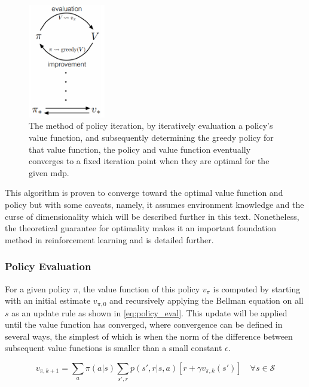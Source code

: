 \documentclass[../report.tex]{subfiles}
\begin{document}
\begin{figure}[H]
    \centering
    \includegraphics[width=0.3\textwidth]{figures/01/gpi.png}
    \caption{The method of policy iteration, by iteratively evaluation a policy's value function, and subsequently determining the greedy policy for that value function, the policy and value function eventually converges to a fixed iteration point when they are optimal for the given \ac{mdp}.}
    \label{fig:pi}
\end{figure}

This algorithm is proven to converge toward the optimal value function and policy\cite{intro_rl} but with some caveats, namely, it assumes environment knowledge and the curse of dimensionality which will be described further in this text. Nonetheless, the theoretical guarantee for optimality makes it an important foundation method in reinforcement learning and is detailed further. 


\subsubsection{Policy Evaluation}

For a given policy $\pi$, the value function of this policy $v_{\pi}$ is computed by starting with an initial estimate $v_{\pi, 0}$ and recursively applying the Bellman equation on all $s$ as an update rule as shown in \autoref{eq:policy_eval}. This update will be applied until the value function has converged, where convergence can be defined in several ways, the simplest of which is when the norm of the difference between subsequent value functions is smaller than a small constant $\epsilon$.

\begin{equation}\label{eq:policy_eval}
    v_{\pi, k+1}= \sum\limits_{a}\pi(a|s) \sum\limits_{s', r} p(s', r|s, a)[r + \gamma v_{\pi, k}(s')] \quad \forall s \in \mathcal{S}
\end{equation}
\end{document}
